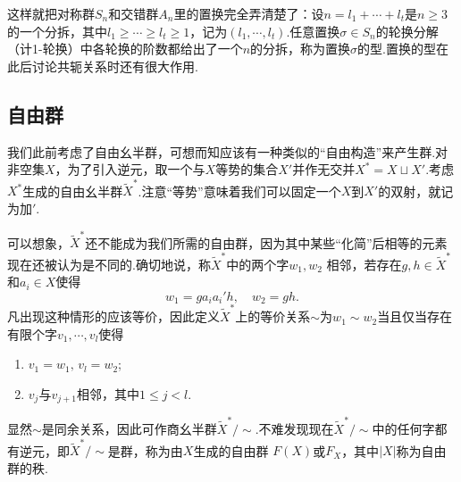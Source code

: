 这样就把对称群$S_n$和交错群$A_n$里的置换完全弄清楚了：设$n=l_1+\cdots+l_t$是$n\ge 3$的一个{\heiti 分拆}，其中$l_1\ge\cdots\ge l_t\ge 1$，记为$(l_1,\cdots,l_t)$.任意置换$\sigma\in S_n$的轮换分解（计1-轮换）中各轮换的阶数都给出了一个$n$的分拆，称为置换$\sigma$的{\heiti 型}.置换的型在此后讨论共轭关系时还有很大作用.
\subsection{自由群}\label{section:FreeGroup}
我们此前考虑了自由幺半群，可想而知应该有一种类似的“自由构造”来产生群.对非空集$X$，为了引入逆元，取一个与$X$等势的集合$X'$并作无交并$X^*=X\sqcup X'$.考虑$X^*$生成的自由幺半群$\widetilde{X}^*$.注意“等势”意味着我们可以固定一个$X$到$X'$的双射，就记为加$'$.

可以想象，$\widetilde{X}^*$还不能成为我们所需的自由群，因为其中某些“化简”后相等的元素现在还被认为是不同的.确切地说，称$\widetilde{X}^*$中的两个字$w_1,w_2$ {\heiti 相邻}，若存在$g,h\in\widetilde{X}^*$和$a_i\in X$使得
\[
	w_1=ga_ia_i'h,\quad w_2=gh.
\]
凡出现这种情形的应该等价，因此定义$\widetilde{X}^*$上的等价关系$\sim$为$w_1\sim w_2$当且仅当存在有限个字$v_1,\cdots,v_l$使得
\begin{enumerate}
	\item $v_1=w_1,\,v_l=w_2$;
	\item $v_j$与$v_{j+1}$相邻，其中$1\le j<l$.
\end{enumerate}
显然$\sim$是同余关系，因此可作商幺半群$\widetilde{X}^*/\sim$.不难发现现在$\widetilde{X}^*/\sim$中的任何字都有逆元，即$\widetilde{X}^*/\sim$是群，称为由$X$生成的{\heiti 自由群} $F(X)$或$F_X$，其中$|X|$称为自由群的{\heiti 秩}.

